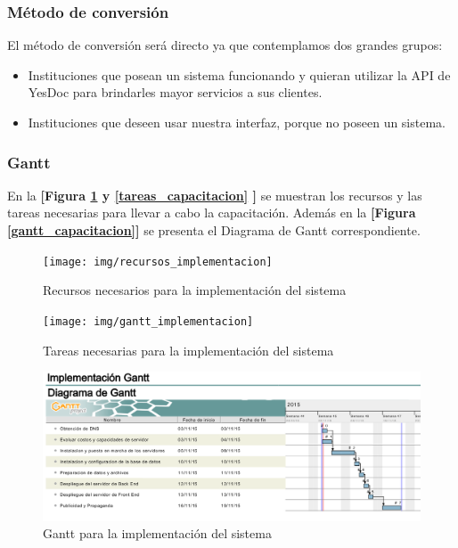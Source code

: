 \subsubsection{Método de conversión}
El método de conversión será directo ya que contemplamos dos grandes grupos:
\begin{itemize}
	\item Instituciones que posean un sistema funcionando y quieran utilizar la API de YesDoc para brindarles mayor servicios a sus clientes.
	\item Instituciones que deseen usar nuestra interfaz, porque no poseen un sistema.
\end{itemize}



\clearpage

\subsubsection{Gantt}
En la \textbf{[Figura \ref{recursos_implementacion} y \ref{tareas_capacitacion} ]} se muestran los recursos y las tareas  necesarias para llevar a cabo la capacitación. Además en la \textbf{[Figura \ref{gantt_capacitacion}]} se presenta el Diagrama de Gantt correspondiente.

\begin{figure}[h!]
	\centering
	\texttt{[image: img/recursos\_implementacion]}
	\caption{Recursos necesarios para la implementación del sistema}
	\label{recursos_implementacion}
\end{figure}


\begin{figure}[h]
	\centering
	\texttt{[image: img/gantt\_implementacion]}
	\caption{Tareas necesarias para la implementación del sistema}
	\label{tareas_implementacion}
\end{figure}

\begin{figure}[h]
	\centering
	\includegraphics[width=1\textwidth]{img/gantt_implementacion2}
	\caption{Gantt para la implementación del sistema}
	\label{gantt_implementacion2}
\end{figure}


